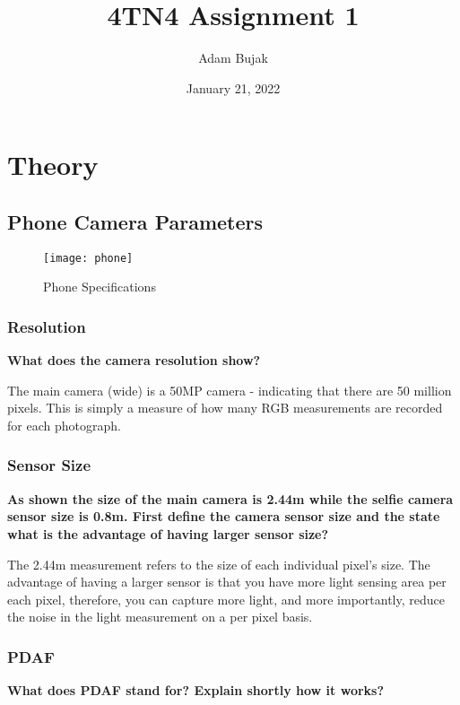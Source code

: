 \documentclass[12pt, letterpaper]{article}
\title{4TN4 Assignment 1}
\author{Adam Bujak}
\date{January 21, 2022}
\begin{document}
\maketitle

\section{Theory}

\subsection{Phone Camera Parameters}

\begin{figure}[h]
    \centering
    \texttt{[image: phone]}
    \caption{Phone Specifications}
    \label{fig:phone}
\end{figure}

\subsubsection{Resolution}

\textbf{What does the camera resolution show?}

The main camera (wide) is a 50MP camera - indicating that there are 50 million pixels. This is simply a measure of how many RGB measurements are recorded for each photograph.

\subsubsection{Sensor Size}

\textbf{As shown the size of the main camera is 2.44\textmu m while the selfie camera sensor size is 0.8\textmu m. First define the
camera sensor size and the state what is the advantage of having larger sensor size?}

The 2.44\textmu m measurement refers to the size of each individual pixel's size. The advantage of having a larger sensor is that you have more light sensing area per each pixel, therefore, you can capture more light, and more importantly, reduce the noise in the light measurement on a per pixel basis.

\subsubsection{PDAF}

\textbf{What does PDAF stand for? Explain shortly how it works?}
\end{document}

